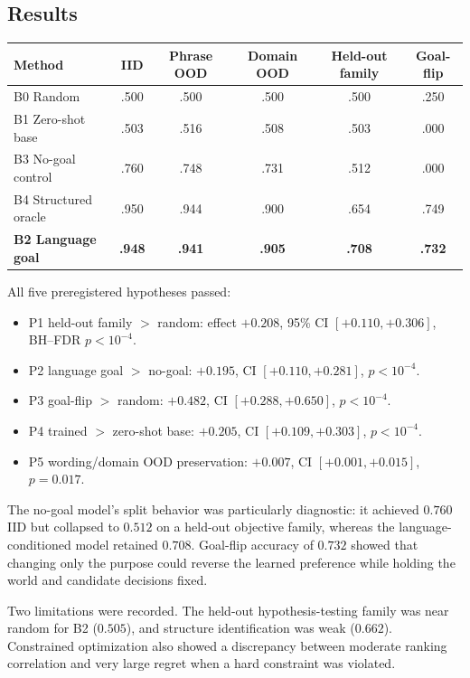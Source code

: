 \documentclass[11pt]{article}
\begin{document}
\subsection{Results}
\begin{center}
\small
\begin{tabular}{lccccc}
\toprule
Method & IID & Phrase OOD & Domain OOD & Held-out family & Goal-flip\\
\midrule
B0 Random & .500 & .500 & .500 & .500 & .250\\
B1 Zero-shot base & .503 & .516 & .508 & .503 & .000\\
B3 No-goal control & .760 & .748 & .731 & .512 & .000\\
B4 Structured oracle & .950 & .944 & .900 & .654 & .749\\
\textbf{B2 Language goal} & \textbf{.948} & \textbf{.941} & \textbf{.905} & \textbf{.708} & \textbf{.732}\\
\bottomrule
\end{tabular}
\end{center}

All five preregistered hypotheses passed:
\begin{itemize}
    \item P1 held-out family $>$ random: effect $+0.208$, 95\% CI $[+0.110,+0.306]$, BH--FDR $p<10^{-4}$.
    \item P2 language goal $>$ no-goal: $+0.195$, CI $[+0.110,+0.281]$, $p<10^{-4}$.
    \item P3 goal-flip $>$ random: $+0.482$, CI $[+0.288,+0.650]$, $p<10^{-4}$.
    \item P4 trained $>$ zero-shot base: $+0.205$, CI $[+0.109,+0.303]$, $p<10^{-4}$.
    \item P5 wording/domain OOD preservation: $+0.007$, CI $[+0.001,+0.015]$, $p=0.017$.
\end{itemize}
The no-goal model's split behavior was particularly diagnostic: it achieved $0.760$ IID but collapsed to $0.512$ on a held-out objective family, whereas the language-conditioned model retained $0.708$. Goal-flip accuracy of $0.732$ showed that changing only the purpose could reverse the learned preference while holding the world and candidate decisions fixed.

Two limitations were recorded. The held-out hypothesis-testing family was near random for B2 ($0.505$), and structure identification was weak ($0.662$). Constrained optimization also showed a discrepancy between moderate ranking correlation and very large regret when a hard constraint was violated.
\end{document}
